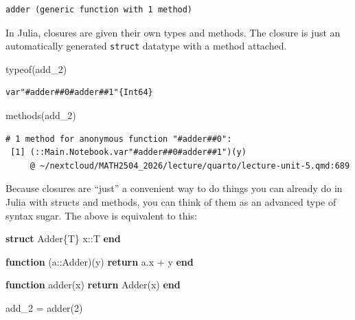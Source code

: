 \documentclass[
]{article}
\newenvironment{Shaded}{\begin{snugshade}}{\end{snugshade}}
\newcommand{\ControlFlowTok}[1]{\textcolor[rgb]{0.00,0.23,0.31}{\textbf{#1}}}
\newcommand{\DataTypeTok}[1]{\textcolor[rgb]{0.68,0.00,0.00}{#1}}
\newcommand{\FloatTok}[1]{\textcolor[rgb]{0.68,0.00,0.00}{#1}}
\newcommand{\FunctionTok}[1]{\textcolor[rgb]{0.28,0.35,0.67}{#1}}
\newcommand{\KeywordTok}[1]{\textcolor[rgb]{0.00,0.23,0.31}{\textbf{#1}}}
\newcommand{\NormalTok}[1]{\textcolor[rgb]{0.00,0.23,0.31}{#1}}
\newcommand{\OperatorTok}[1]{\textcolor[rgb]{0.37,0.37,0.37}{#1}}
\begin{document}
\begin{verbatim}
adder (generic function with 1 method)
\end{verbatim}

In Julia, closures are given their own types and methods. The closure is
just an automatically generated \texttt{struct} datatype with a method
attached.

\begin{Shaded}
\begin{Highlighting}[]
\FunctionTok{typeof}\NormalTok{(add\_2)}
\end{Highlighting}
\end{Shaded}

\begin{verbatim}
var"#adder##0#adder##1"{Int64}
\end{verbatim}

\begin{Shaded}
\begin{Highlighting}[]
\FunctionTok{methods}\NormalTok{(add\_2)}
\end{Highlighting}
\end{Shaded}

\begin{verbatim}
# 1 method for anonymous function "#adder##0":
 [1] (::Main.Notebook.var"#adder##0#adder##1")(y)
     @ ~/nextcloud/MATH2504_2026/lecture/quarto/lecture-unit-5.qmd:689
\end{verbatim}

Because closures are ``just'' a convenient way to do things you can
already do in Julia with structs and methods, you can think of them as
an advanced type of syntax sugar. The above is equivalent to this:

\begin{Shaded}
\begin{Highlighting}[]
\KeywordTok{struct}\NormalTok{ Adder\{T\}}
\NormalTok{   x}\OperatorTok{::}\DataTypeTok{T}
\KeywordTok{end}

\KeywordTok{function}\NormalTok{ (a}\OperatorTok{::}\DataTypeTok{Adder}\NormalTok{)(y)}
   \ControlFlowTok{return}\NormalTok{ a.x }\OperatorTok{+}\NormalTok{ y}
\KeywordTok{end}

\KeywordTok{function} \FunctionTok{adder}\NormalTok{(x)}
   \ControlFlowTok{return} \FunctionTok{Adder}\NormalTok{(x)}
\KeywordTok{end}

\NormalTok{add\_2 }\OperatorTok{=} \FunctionTok{adder}\NormalTok{(}\FloatTok{2}\NormalTok{)}
\end{Highlighting}
\end{Shaded}
\end{document}
